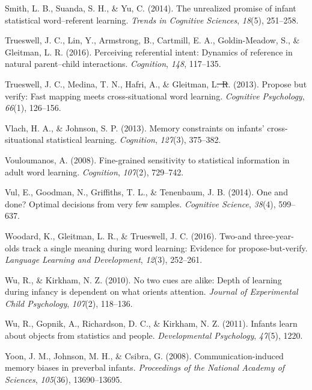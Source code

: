 \documentclass[authoryear, review]{elsarticle}
\providecommand{\DIFdeltex}[1]{{\protect\color{red}\sout{#1}}}                      %
\providecommand{\DIFdelbegin}{} %
\providecommand{\DIFdelend}{} %
\providecommand{\DIFdel}[1]{\texorpdfstring{\DIFdeltex{#1}}{}} %
\begin{document}
\hypertarget{ref-smith2014unrealized}{}
Smith, L. B., Suanda, S. H., \& Yu, C. (2014). The unrealized promise of
infant statistical word--referent learning. \emph{Trends in Cognitive
Sciences}, \emph{18}(5), 251--258.

\hypertarget{ref-trueswell2016perceiving}{}
Trueswell, J. C., Lin, Y., Armstrong, B., Cartmill, E. A.,
Goldin-Meadow, S., \& Gleitman, L. R. (2016). Perceiving referential
intent: Dynamics of reference in natural parent--child interactions.
\emph{Cognition}, \emph{148}, 117--135.

\hypertarget{ref-trueswell2013propose}{}
Trueswell, J. C., Medina, T. N., Hafri, A., \& Gleitman, L\DIFdelbegin \DIFdel{. R}\DIFdelend . (2013).
Propose but verify: Fast mapping meets cross-situational word learning.
\emph{Cognitive Psychology}, \emph{66}(1), 126--156.

\hypertarget{ref-vlach2013memory}{}
Vlach, H. A., \& Johnson, S. P. (2013). Memory constraints on infants'
cross-situational statistical learning. \emph{Cognition}, \emph{127}(3),
375--382.

\hypertarget{ref-vouloumanos2008fine}{}
Vouloumanos, A. (2008). Fine-grained sensitivity to statistical
information in adult word learning. \emph{Cognition}, \emph{107}(2),
729--742.

\hypertarget{ref-vul2014}{}
Vul, E., Goodman, N., Griffiths, T. L., \& Tenenbaum, J. B. (2014). One
and done? Optimal decisions from very few samples. \emph{Cognitive
Science}, \emph{38}(4), 599--637.

\hypertarget{ref-woodard2016two}{}
Woodard, K., Gleitman, L. R., \& Trueswell, J. C. (2016). Two-and
three-year-olds track a single meaning during word learning: Evidence
for propose-but-verify. \emph{Language Learning and Development},
\emph{12}(3), 252--261.

\hypertarget{ref-wu2010no}{}
Wu, R., \& Kirkham, N. Z. (2010). No two cues are alike: Depth of
learning during infancy is dependent on what orients attention.
\emph{Journal of Experimental Child Psychology}, \emph{107}(2),
118--136.

\hypertarget{ref-wu2011infants}{}
Wu, R., Gopnik, A., Richardson, D. C., \& Kirkham, N. Z. (2011). Infants
learn about objects from statistics and people. \emph{Developmental
Psychology}, \emph{47}(5), 1220.

\hypertarget{ref-yoon2008communication}{}
Yoon, J. M., Johnson, M. H., \& Csibra, G. (2008). Communication-induced
memory biases in preverbal infants. \emph{Proceedings of the National
Academy of Sciences}, \emph{105}(36), 13690--13695.
\end{document}
